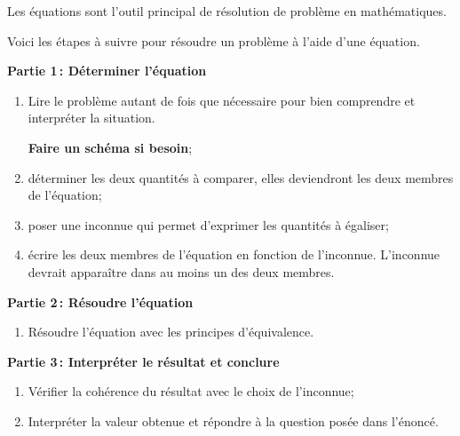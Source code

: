 \documentclass[a4paper,12pt]{report}
\begin{document}
Les équations sont l'outil principal de résolution de problème en mathématiques. 

Voici les étapes à suivre pour résoudre un problème à l'aide d'une équation.

{\bfseries Partie 1\,: Déterminer l'équation}
\begin{enumerate}[1)]
	\item Lire le problème autant de fois que nécessaire pour bien comprendre et interpréter la situation.

		{\bfseries Faire un schéma si besoin};
	\item déterminer les deux quantités à comparer, elles deviendront les deux membres de l'équation;
	\item poser une inconnue qui permet d'exprimer les quantités à égaliser;
	\item écrire les deux membres de l'équation en fonction de l'inconnue. L'inconnue devrait apparaître dans au moins un des deux membres.
\end{enumerate}
{\bfseries Partie 2\,: Résoudre l'équation}
\begin{enumerate}[1),resume]
	\item Résoudre l'équation avec les principes d'équivalence.
\end{enumerate}
{\bfseries Partie 3\,: Interpréter le résultat et conclure}
\begin{enumerate}[1),resume]
	\item Vérifier la cohérence du résultat avec le choix de l'inconnue;
	\item Interpréter la valeur obtenue et répondre à la question posée dans l'énoncé.
\end{enumerate}
\begin{boiteExT}[Exemple 1]
	
\vspace{6.5cm}

\end{boiteExT}
\begin{boiteExT}[Exemple 2]
	
\vspace{6.5cm}

\end{boiteExT}
\newpage
\end{document}
